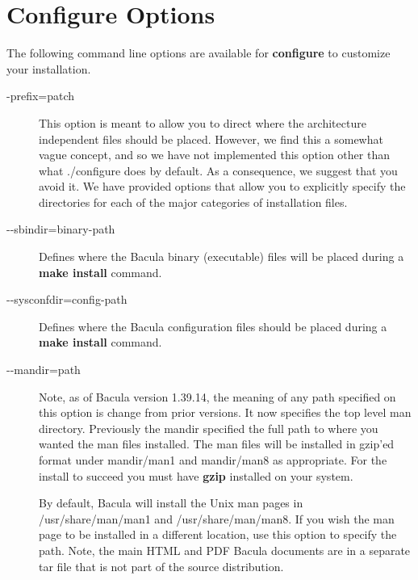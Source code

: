 \section{Configure Options}
\label{Options}

The following command line options are available for {\bf configure} to
customize your installation. 

\begin{description}
\item [ {-}prefix=\lt{}patch\gt{}]
   This option is meant to allow you to direct where the architecture
   independent files should be placed.  However, we find this a somewhat
   vague concept, and so we have not implemented this option other than
   what ./configure does by default.  As a consequence, we suggest that
   you avoid it. We have provided options that allow you to explicitly
   specify the directories for each of the major categories of installation
   files.
\item [ {-}{-}sbindir=\lt{}binary-path\gt{}]
   Defines where the Bacula  binary (executable) files will be placed during a
   {\bf make  install} command.  

\item [ {-}{-}sysconfdir=\lt{}config-path\gt{}]
   Defines where the Bacula configuration files should be placed during a
   {\bf make install} command.

\item [ {-}{-}mandir=\lt{}path\gt{}]
   Note, as of Bacula version 1.39.14, the meaning of any path
   specified on this option is change from prior versions. It
   now specifies the top level man directory.
   Previously the mandir specified the full path to where you
   wanted the man files installed.
   The man files will be installed in gzip'ed format under
   mandir/man1 and mandir/man8 as appropriate.
   For the install to succeed you must have {\bf gzip} installed
   on your system.

   By default, Bacula will install the Unix man pages in 
   /usr/share/man/man1 and /usr/share/man/man8.  
   If you wish the man page to be installed in
   a different location, use this option to specify the path.
   Note, the main HTML and PDF Bacula documents are in a separate
   tar file that is not part of the source distribution.


\end{description}
